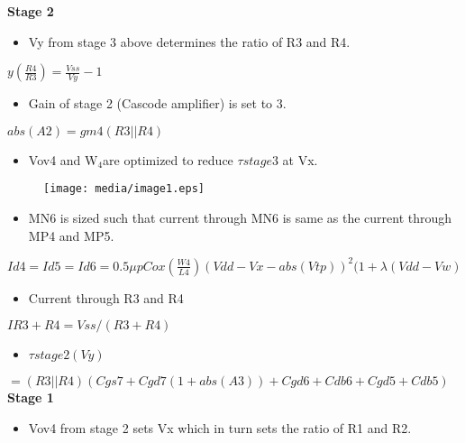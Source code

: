 \documentclass[12pt,a4paper]{article}
\begin{document}
\textbf{Stage 2}

\begin{itemize}
\item Vy from stage 3 above determines the ratio of R3 and R4.
\end{itemize}
$y (\frac{R4}{R3})=\frac{Vss}{Vy}-1 $\\


\begin{itemize}
\item Gain of stage 2 (Cascode amplifier) is set to 3.
\end{itemize}
$abs(A2)=gm4(R3 || R4) $\\


\begin{itemize}
\item Vov4 and W$_{4 }$are optimized to reduce $\tau stage3$ at Vx. 

\end{itemize}
\begin{figure}[h]
\centering
\texttt{[image: media/image1.eps]}
\end{figure}


\begin{itemize}
\item MN6 is sized such that current through MN6 is same as the current 
through MP4 and MP5. 
\end{itemize}
$Id4=Id5=Id6=0.5\mu pCox(\frac{W4}{L4})(Vdd-Vx-abs(Vtp))^{2} (1+\lambda 
(Vdd-Vw)$\\


\begin{itemize}
\item Current through R3 and R4
\end{itemize}
$IR3+R4=Vss/(R3+R4)$\\




\begin{itemize}
\item $\tau stage2 (Vy)$
\end{itemize}
$=(R3 || R4)(Cgs7+Cgd7 (1+abs(A3))+Cgd6+Cdb6+Cgd5+Cdb5)$\\




\textbf{Stage 1}

\begin{itemize}
\item Vov4 from stage 2 sets Vx which in turn sets the ratio of R1 and 
R2.
\end{itemize}
\end{document}
